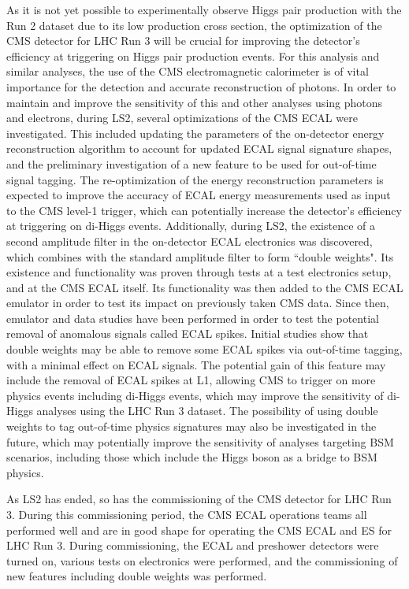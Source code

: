 As it is not yet possible to experimentally observe Higgs pair production with the Run 2 dataset due to its low production cross section, the optimization of the CMS detector for LHC Run 3 will be crucial for improving the detector's efficiency at triggering on Higgs pair production events. For this analysis and similar analyses, the use of the CMS electromagnetic calorimeter is of vital importance for the detection and accurate reconstruction of photons. In order to maintain and improve the sensitivity of this and other analyses using photons and electrons, during LS2, several optimizations of the CMS ECAL were investigated. This included updating the parameters of the on-detector energy reconstruction algorithm to account for updated ECAL signal signature shapes, and the preliminary investigation of a new feature to be used for out-of-time signal tagging. The re-optimization of the energy reconstruction parameters is expected to improve the accuracy of ECAL energy measurements used as input to the CMS level-1 trigger, which can potentially increase the detector's efficiency at triggering on di-Higgs events. Additionally, during LS2, the existence of a second amplitude filter in the on-detector ECAL electronics was discovered, which combines with the standard amplitude filter to form ``double weights". Its existence and functionality was proven through tests at a test electronics setup, and at the CMS ECAL itself. Its functionality was then added to the CMS ECAL emulator in order to test its impact on previously taken CMS data. Since then, emulator and data studies have been performed in order to test the potential removal of anomalous signals called ECAL spikes. Initial studies show that double weights may be able to remove some ECAL spikes via out-of-time tagging, with a minimal effect on ECAL signals. The potential gain of this feature may include the removal of ECAL spikes at L1, allowing CMS to trigger on more physics events including di-Higgs events, which may improve the sensitivity of di-Higgs analyses using the LHC Run 3 dataset. The possibility of using double weights to tag out-of-time physics signatures may also be investigated in the future, which may potentially improve the sensitivity of analyses targeting BSM scenarios, including those which include the Higgs boson as a bridge to BSM physics.

As LS2 has ended, so has the commissioning of the CMS detector for LHC Run 3. During this commissioning period, the CMS ECAL operations teams all performed well and are in good shape for operating the CMS ECAL and ES for LHC Run 3. During commissioning, the ECAL and preshower detectors were turned on, various tests on electronics were performed, and the commissioning of new features including double weights was performed. 

